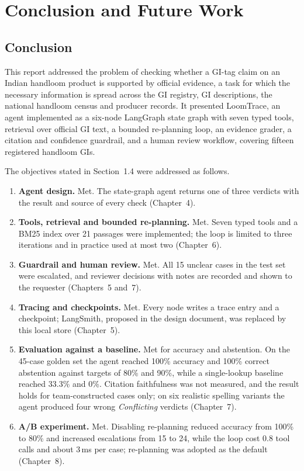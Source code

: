 \chapter{Conclusion and Future Work}

\section{Conclusion}

This report addressed the problem of checking whether a GI-tag claim on an Indian handloom product is
supported by official evidence, a task for which the necessary information is spread across the GI
registry, GI descriptions, the national handloom census and producer records. It presented LoomTrace,
an agent implemented as a six-node LangGraph state graph with seven typed tools, retrieval over official
GI text, a bounded re-planning loop, an evidence grader, a citation and confidence guardrail, and a
human review workflow, covering fifteen registered handloom GIs.

The objectives stated in Section~1.4 were addressed as follows.

\begin{enumerate}[itemsep=2pt]
\item \textbf{Agent design.} Met. The state-graph agent returns one of three verdicts with the result
and source of every check (Chapter~4).
\item \textbf{Tools, retrieval and bounded re-planning.} Met. Seven typed tools and a BM25 index over
21 passages were implemented; the loop is limited to three iterations and in practice used at most two
(Chapter~6).
\item \textbf{Guardrail and human review.} Met. All 15 unclear cases in the test set were escalated, and
reviewer decisions with notes are recorded and shown to the requester (Chapters~5 and~7).
\item \textbf{Tracing and checkpoints.} Met. Every node writes a trace entry and a checkpoint; LangSmith,
proposed in the design document, was replaced by this local store (Chapter~5).
\item \textbf{Evaluation against a baseline.} Met for accuracy and abstention. On the 45-case golden set
the agent reached 100\% accuracy and 100\% correct abstention against targets of 80\% and 90\%, while a
single-lookup baseline reached 33.3\% and 0\%. Citation faithfulness was not measured, and the result
holds for team-constructed cases only; on six realistic spelling variants the agent produced four wrong
\emph{Conflicting} verdicts (Chapter~7).
\item \textbf{A/B experiment.} Met. Disabling re-planning reduced accuracy from 100\% to 80\% and
increased escalations from 15 to 24, while the loop cost 0.8 tool calls and about 3\,ms per case;
re-planning was adopted as the default (Chapter~8).
\end{enumerate}

